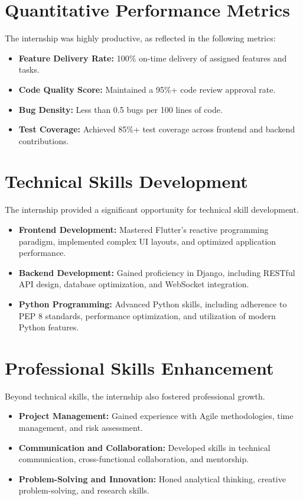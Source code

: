 \section{Quantitative Performance Metrics}
The internship was highly productive, as reflected in the following metrics:
\begin{itemize}
    \item \textbf{Feature Delivery Rate:} 100\% on-time delivery of assigned features and tasks.
    \item \textbf{Code Quality Score:} Maintained a 95\%+ code review approval rate.
    \item \textbf{Bug Density:} Less than 0.5 bugs per 100 lines of code.
    \item \textbf{Test Coverage:} Achieved 85\%+ test coverage across frontend and backend contributions.
\end{itemize}

\section{Technical Skills Development}
The internship provided a significant opportunity for technical skill development.
\begin{itemize}
    \item \textbf{Frontend Development:} Mastered Flutter's reactive programming paradigm, implemented complex UI layouts, and optimized application performance.
    \item \textbf{Backend Development:} Gained proficiency in Django, including RESTful API design, database optimization, and WebSocket integration.
    \item \textbf{Python Programming:} Advanced Python skills, including adherence to PEP 8 standards, performance optimization, and utilization of modern Python features.
\end{itemize}

\section{Professional Skills Enhancement}
Beyond technical skills, the internship also fostered professional growth.
\begin{itemize}
    \item \textbf{Project Management:} Gained experience with Agile methodologies, time management, and risk assessment.
    \item \textbf{Communication and Collaboration:} Developed skills in technical communication, cross-functional collaboration, and mentorship.
    \item \textbf{Problem-Solving and Innovation:} Honed analytical thinking, creative problem-solving, and research skills.
\end{itemize}

